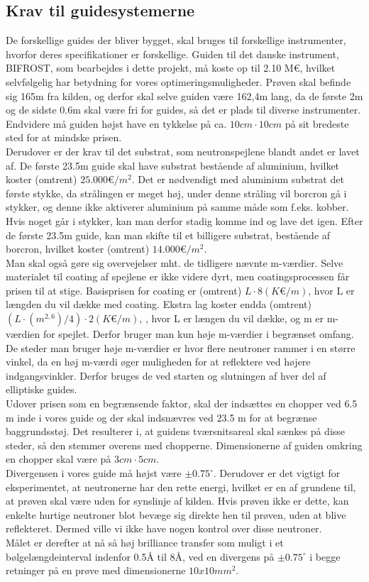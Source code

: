 \documentclass[12pt,oneside,a4paper]{article}
\begin{document}
{{{{{\subsection{Krav til guidesystemerne}
De forskellige guides der bliver bygget, skal bruges til forskellige instrumenter, hvorfor deres specifikationer er forskellige. Guiden til det danske instrument, BIFROST, som bearbejdes i dette projekt, må koste op til 2.10 M€, hvilket selvfølgelig har betydning for vores optimeringsmuligheder. Prøven skal befinde sig 165m fra kilden, og derfor skal selve guiden være 162,4m lang, da de første 2m og de sidste 0.6m skal være fri for guides, så det er plads til diverse instrumenter. Endvidere må guiden højst have en tykkelse på ca. $10cm \cdot 10cm$ på sit bredeste sted for at mindske prisen.
\\
Derudover er der krav til det substrat, som neutronspejlene blandt andet er lavet af. De første 23.5m guide skal have substrat bestående af aluminium, hvilket koster (omtrent) $25.000 \text{€}/m^2$. Det er nødvendigt med aluminium substrat det første stykke, da strålingen er meget høj, under denne stråling vil borcron gå i stykker, og denne ikke aktiverer aluminium på samme måde som f.eks. kobber. Hvis noget går i stykker, kan man derfor stadig komme ind og lave det igen. Efter de første 23.5m guide, kan man skifte til et billigere substrat, bestående af borcron, hvilket koster (omtrent) $14.000 \text{€}/m^2$.
\\
Man skal også gøre sig overvejelser mht. de tidligere nævnte m-værdier. Selve materialet til coating af spejlene er ikke videre dyrt, men coatingsprocessen får prisen til at stige. Basisprisen for coating er (omtrent) $L\cdot 8 (K\text{€}/m)$, hvor L er længden du vil dække med coating. Ekstra lag koster endda (omtrent) $(L\cdot(m^{2,6})/4)\cdot 2 (K\text{€}/m)$, , hvor L er længen du vil dække, og m er m-værdien for spejlet. Derfor bruger man kun høje m-værdier i begrænset omfang. De steder man bruger høje m-værdier er hvor flere neutroner rammer i en større vinkel, da en høj m-værdi øger muligheden for at reflektere ved højere indgangsvinkler. Derfor bruges de ved starten og slutningen af hver del af elliptiske guides.
\\
Udover prisen som en begrænsende faktor, skal der indsættes en chopper ved 6.5 m inde i vores guide og der skal indsnævres ved 23.5 m for at begrænse baggrundsstøj. Det resulterer i, at guidens tværsnitsareal skal sænkes på disse steder, så den stemmer overens med chopperne. Dimensionerne af guiden omkring en chopper skal være på $3cm\cdot5cm$. 
\\
Divergensen i vores guide må højst være $\pm0.75^\circ$. Derudover er det vigtigt for eksperimentet, at neutronerne har den rette energi, hvilket er en af grundene til, at prøven skal være uden for synslinje af kilden. Hvis prøven ikke er dette, kan enkelte hurtige neutroner blot  bevæge sig direkte hen til prøven, uden at blive reflekteret. Dermed ville vi ikke have nogen kontrol over disse neutroner.
\\
Målet er derefter at nå så høj brilliance transfer som muligt i et bølgelængdeinterval indenfor 0.5Å til 8Å, ved en divergens på $\pm0.75^\circ$ i begge retninger på en prøve med dimensionerne $10x10 mm^2$.

}}}}}
\end{document}
